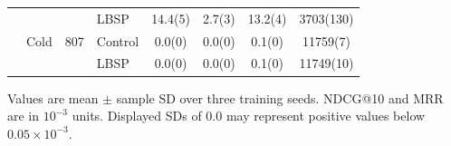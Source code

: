 \begin{table}[!htbp]
\begin{tabular*}{\textwidth}{@{\extracolsep{\fill}}llS[table-format=4.0]lS[table-format=2.1(3)]S[table-format=2.1(3)]S[table-format=2.1(3)]S[table-format=5.0(3),table-align-uncertainty=false]@{}}
 &  &  & LBSP & 14.4(5) & 2.7(3) & 13.2(4) & 3703(130)\\ %
 & Cold & 807 & Control & 0.0(0) & 0.0(0) & 0.1(0) & 11759(7)\\ %
 &  &  & LBSP & 0.0(0) & 0.0(0) & 0.1(0) & 11749(10)\\ %
\bottomrule
\end{tabular*}
\par\smallskip\noindent\begin{minipage}{\textwidth}\fontsize{8.5}{11}\selectfont Values are mean $\pm$ sample SD over three training seeds. NDCG@10 and MRR are in $10^{-3}$ units. Displayed SDs of 0.0 may represent positive values below $0.05\times10^{-3}$.
\end{minipage}
\end{table}
